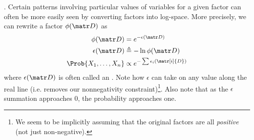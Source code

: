\documentclass[11pt]{article}
\newcommand\myspace[1][]{\vspace{#1\bigskipamount}}
\newcommand\p{\Needspace{10\baselineskip} \noindent}
\begin{document}
\myspace
\p {}. Certain patterns involving particular values of variables for a given factor can often be more easily seen by converting factors into log-space. More precisely, we can rewrite a factor $\phi(\matr D)$ as
\begin{align}
	\phi(\matr D) &= e^{- \epsilon(\matr D)} \\
	\epsilon(\matr D) &\triangleq -\ln \phi(\matr D) \\
	\Prob{X_1, \ldots, X_n} &\propto e^{- \sum \epsilon_i(\matr[i]{D}   )}
\end{align} 
where $\epsilon(\matr D)$ is often called an . Note how $\epsilon$ can take on any value along the real line (i.e. removes our nonnegativity constraint)\footnote{We seem to be implicitly assuming that the original factors are all \textit{positive} (not just non-negative).}. Also note that as the $\epsilon$ summation approaches 0, the probability approaches one. 
\end{document}
